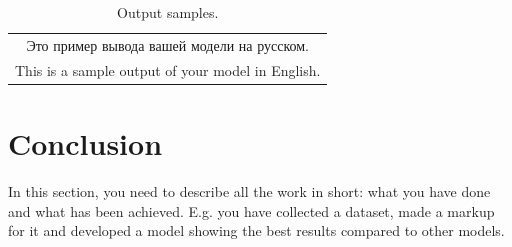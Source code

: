 \documentclass{article}
\begin{document}
\begin{table}[!tbh]
    \centering
    \begin{tabular}{|c|}
\hline
Это пример вывода вашей модели на русском.\\
This is a sample output of your model in English.
\\
\hline
    \end{tabular}
    \caption{Output samples.}
    \label{tab:output}
\end{table}

\section{Conclusion}
In this section, you need to describe all the work in short: what you have done and what has been achieved. E.g. you have collected a dataset, made a markup for it and developed a model showing the best results compared to other models. 



\end{document}
